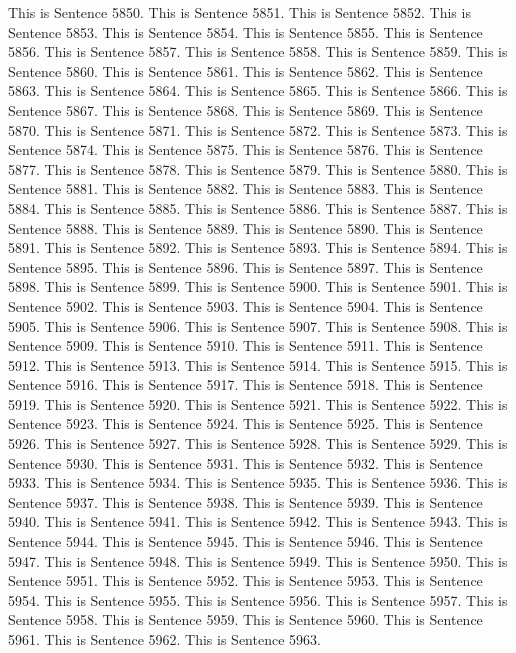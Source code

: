 \documentclass{article}
\begin{document}
This is Sentence 5850.
This is Sentence 5851.
This is Sentence 5852.
This is Sentence 5853.
This is Sentence 5854.
This is Sentence 5855.
This is Sentence 5856.
This is Sentence 5857.
This is Sentence 5858.
This is Sentence 5859.
This is Sentence 5860.
This is Sentence 5861.
This is Sentence 5862.
This is Sentence 5863.
This is Sentence 5864.
This is Sentence 5865.
This is Sentence 5866.
This is Sentence 5867.
This is Sentence 5868.
This is Sentence 5869.
This is Sentence 5870.
This is Sentence 5871.
This is Sentence 5872.
This is Sentence 5873.
This is Sentence 5874.
This is Sentence 5875.
This is Sentence 5876.
This is Sentence 5877.
This is Sentence 5878.
This is Sentence 5879.
This is Sentence 5880.
This is Sentence 5881.
This is Sentence 5882.
This is Sentence 5883.
This is Sentence 5884.
This is Sentence 5885.
This is Sentence 5886.
This is Sentence 5887.
This is Sentence 5888.
This is Sentence 5889.
This is Sentence 5890.
This is Sentence 5891.
This is Sentence 5892.
This is Sentence 5893.
This is Sentence 5894.
This is Sentence 5895.
This is Sentence 5896.
This is Sentence 5897.
This is Sentence 5898.
This is Sentence 5899.
This is Sentence 5900.
This is Sentence 5901.
This is Sentence 5902.
This is Sentence 5903.
This is Sentence 5904.
This is Sentence 5905.
This is Sentence 5906.
This is Sentence 5907.
This is Sentence 5908.
This is Sentence 5909.
This is Sentence 5910.
This is Sentence 5911.
This is Sentence 5912.
This is Sentence 5913.
This is Sentence 5914.
This is Sentence 5915.
This is Sentence 5916.
This is Sentence 5917.
This is Sentence 5918.
This is Sentence 5919.
This is Sentence 5920.
This is Sentence 5921.
This is Sentence 5922.
This is Sentence 5923.
This is Sentence 5924.
This is Sentence 5925.
This is Sentence 5926.
This is Sentence 5927.
This is Sentence 5928.
This is Sentence 5929.
This is Sentence 5930.
This is Sentence 5931.
This is Sentence 5932.
This is Sentence 5933.
This is Sentence 5934.
This is Sentence 5935.
This is Sentence 5936.
This is Sentence 5937.
This is Sentence 5938.
This is Sentence 5939.
This is Sentence 5940.
This is Sentence 5941.
This is Sentence 5942.
This is Sentence 5943.
This is Sentence 5944.
This is Sentence 5945.
This is Sentence 5946.
This is Sentence 5947.
This is Sentence 5948.
This is Sentence 5949.
This is Sentence 5950.
This is Sentence 5951.
This is Sentence 5952.
This is Sentence 5953.
This is Sentence 5954.
This is Sentence 5955.
This is Sentence 5956.
This is Sentence 5957.
This is Sentence 5958.
This is Sentence 5959.
This is Sentence 5960.
This is Sentence 5961.
This is Sentence 5962.
This is Sentence 5963.
\end{document}
